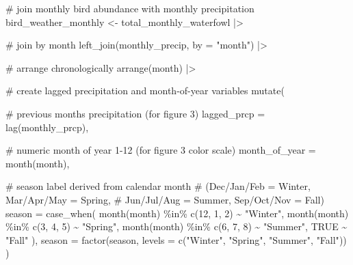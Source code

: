 \documentclass[
  letterpaper,
  DIV=11,
  numbers=noendperiod]{scrartcl}
\newenvironment{Shaded}{\begin{snugshade}}{\end{snugshade}}
\newcommand{\AttributeTok}[1]{\textcolor[rgb]{0.40,0.45,0.13}{#1}}
\newcommand{\CommentTok}[1]{\textcolor[rgb]{0.37,0.37,0.37}{#1}}
\newcommand{\ConstantTok}[1]{\textcolor[rgb]{0.56,0.35,0.01}{#1}}
\newcommand{\DecValTok}[1]{\textcolor[rgb]{0.68,0.00,0.00}{#1}}
\newcommand{\FunctionTok}[1]{\textcolor[rgb]{0.28,0.35,0.67}{#1}}
\newcommand{\NormalTok}[1]{\textcolor[rgb]{0.00,0.23,0.31}{#1}}
\newcommand{\OtherTok}[1]{\textcolor[rgb]{0.00,0.23,0.31}{#1}}
\newcommand{\SpecialCharTok}[1]{\textcolor[rgb]{0.37,0.37,0.37}{#1}}
\newcommand{\StringTok}[1]{\textcolor[rgb]{0.13,0.47,0.30}{#1}}
\begin{document}
\begin{Shaded}
\begin{Highlighting}[]
\CommentTok{\# join monthly bird abundance with monthly precipitation}
\NormalTok{bird\_weather\_monthly }\OtherTok{\textless{}{-}}\NormalTok{ total\_monthly\_waterfowl }\SpecialCharTok{|\textgreater{}}

  \CommentTok{\# join by month}
  \FunctionTok{left\_join}\NormalTok{(monthly\_precip,}
            \AttributeTok{by =} \StringTok{"month"}\NormalTok{) }\SpecialCharTok{|\textgreater{}}

  \CommentTok{\# arrange chronologically}
  \FunctionTok{arrange}\NormalTok{(month) }\SpecialCharTok{|\textgreater{}}

  \CommentTok{\# create lagged precipitation and month{-}of{-}year variables}
  \FunctionTok{mutate}\NormalTok{(}

    \CommentTok{\# previous month\textquotesingle{}s precipitation (for figure 3)}
    \AttributeTok{lagged\_prcp =} \FunctionTok{lag}\NormalTok{(monthly\_prcp),}

    \CommentTok{\# numeric month of year 1{-}12 (for figure 3 color scale)}
    \AttributeTok{month\_of\_year =} \FunctionTok{month}\NormalTok{(month),}

    \CommentTok{\# season label derived from calendar month}
    \CommentTok{\# (Dec/Jan/Feb = Winter, Mar/Apr/May = Spring,}
    \CommentTok{\#  Jun/Jul/Aug = Summer, Sep/Oct/Nov = Fall)}
    \AttributeTok{season =} \FunctionTok{case\_when}\NormalTok{(}
      \FunctionTok{month}\NormalTok{(month) }\SpecialCharTok{\%in\%} \FunctionTok{c}\NormalTok{(}\DecValTok{12}\NormalTok{, }\DecValTok{1}\NormalTok{, }\DecValTok{2}\NormalTok{) }\SpecialCharTok{\textasciitilde{}} \StringTok{"Winter"}\NormalTok{,}
      \FunctionTok{month}\NormalTok{(month) }\SpecialCharTok{\%in\%} \FunctionTok{c}\NormalTok{(}\DecValTok{3}\NormalTok{, }\DecValTok{4}\NormalTok{, }\DecValTok{5}\NormalTok{)  }\SpecialCharTok{\textasciitilde{}} \StringTok{"Spring"}\NormalTok{,}
      \FunctionTok{month}\NormalTok{(month) }\SpecialCharTok{\%in\%} \FunctionTok{c}\NormalTok{(}\DecValTok{6}\NormalTok{, }\DecValTok{7}\NormalTok{, }\DecValTok{8}\NormalTok{)  }\SpecialCharTok{\textasciitilde{}} \StringTok{"Summer"}\NormalTok{,}
      \ConstantTok{TRUE}                           \SpecialCharTok{\textasciitilde{}} \StringTok{"Fall"}
\NormalTok{    ),}
    \AttributeTok{season =} \FunctionTok{factor}\NormalTok{(season, }\AttributeTok{levels =} \FunctionTok{c}\NormalTok{(}\StringTok{"Winter"}\NormalTok{, }\StringTok{"Spring"}\NormalTok{, }\StringTok{"Summer"}\NormalTok{, }\StringTok{"Fall"}\NormalTok{))}
\NormalTok{  )}
\end{Highlighting}
\end{Shaded}
\end{document}
